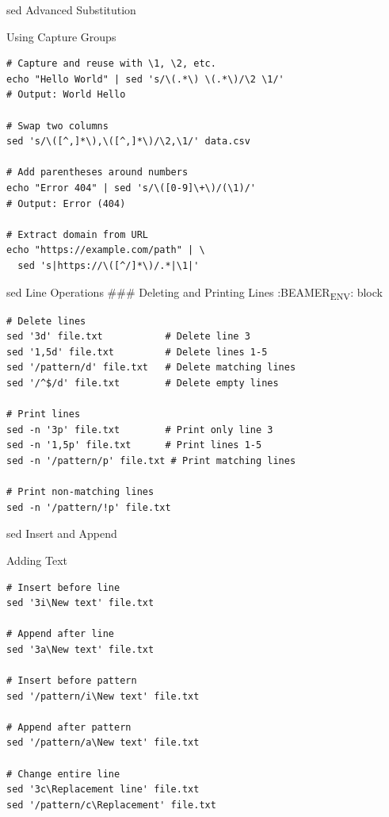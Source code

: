 \documentclass[presentation,aspectratio=1610]{beamer}
\begin{document}
\begin{frame}[label={sec:org6b2b4d6},fragile]{sed Advanced Substitution}
 \begin{block}{Using Capture Groups}
\begin{verbatim}
# Capture and reuse with \1, \2, etc.
echo "Hello World" | sed 's/\(.*\) \(.*\)/\2 \1/'
# Output: World Hello

# Swap two columns
sed 's/\([^,]*\),\([^,]*\)/\2,\1/' data.csv

# Add parentheses around numbers
echo "Error 404" | sed 's/\([0-9]\+\)/(\1)/'
# Output: Error (404)

# Extract domain from URL
echo "https://example.com/path" | \
  sed 's|https://\([^/]*\)/.*|\1|'
\end{verbatim}
\end{block}
\end{frame}
\begin{frame}[label={sec:orgee740c6},fragile]{sed Line Operations}
 \#\#\# Deleting and Printing Lines
:BEAMER\textsubscript{ENV}: block

\begin{verbatim}
# Delete lines
sed '3d' file.txt           # Delete line 3
sed '1,5d' file.txt         # Delete lines 1-5
sed '/pattern/d' file.txt   # Delete matching lines
sed '/^$/d' file.txt        # Delete empty lines

# Print lines
sed -n '3p' file.txt        # Print only line 3
sed -n '1,5p' file.txt      # Print lines 1-5
sed -n '/pattern/p' file.txt # Print matching lines

# Print non-matching lines
sed -n '/pattern/!p' file.txt
\end{verbatim}
\end{frame}
\begin{frame}[label={sec:orgd1aa102},fragile]{sed Insert and Append}
 \begin{block}{Adding Text}
\begin{verbatim}
# Insert before line
sed '3i\New text' file.txt

# Append after line
sed '3a\New text' file.txt

# Insert before pattern
sed '/pattern/i\New text' file.txt

# Append after pattern
sed '/pattern/a\New text' file.txt

# Change entire line
sed '3c\Replacement line' file.txt
sed '/pattern/c\Replacement' file.txt
\end{verbatim}
\end{block}
\end{frame}
\end{document}
